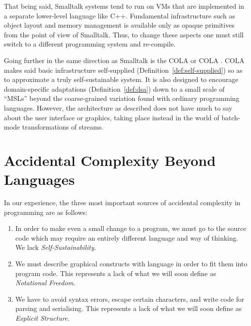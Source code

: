 \documentclass[ twoside,openright,titlepage,numbers=noenddot,headinclude,footinclude,cleardoublepage=empty,abstract=on,
                BCOR=5mm,paper=a4,fontsize=11pt
                ]{scrreprt}
\newcommand{\joel}[1]{}
\providecommand{\tightlist}{}\newenvironment{longtable}[2]{\begin{tabular}}{\end{tabular}}
\theoremstyle{definition}
\begin{document}
That being said, Smalltalk systems tend to run on VMs that are
implemented in a separate lower-level language like C++. Fundamental
infrastructure such as object layout and memory management is available
only as opaque primitives from the point of view of Smalltalk. Thus, to
change these aspects one must still switch to a different programming
system and re-compile.

Going further in the same direction as Smalltalk is the \acl{COLA} or
\acs{COLA}  \parencite{COLAs}. \ac{COLA} makes said basic
infrastructure self-supplied (Definition~\ref{def:self-supplied}) so as
to approximate a truly self-sustainable system. It is also designed to
encourage domain-specific adaptations (Definition~\ref{def:dsa}) down to
a small scale of ``\acp{MSL}'' beyond the coarse-grained variation found
with ordinary programming languages. However, the architecture as
described does not have much to say about the user interface or
graphics, taking place instead in the world of batch-mode
transformations of streams.

\joel{
## The Missing Synthesis

We have given the above examples because they demonstrate some of our ideals from Section\ \ref{how-should-things-work}. Web browsers and Smalltalk exhibit GUIs with the potential for domain-specific graphical adaptation (Web, Smalltalk)
2. Reliable, persistent naïve pokeability of state and behaviour (Smalltalk, COLA)
3. Full self-sustainability with domain-specific languages (COLA)

Why has a synthesis of all three not been achieved? Part of the difficulty is that programming is framed in terms of *languages* with a focus on parsed syntax and batch-mode transformations. This makes it an uphill battle to achieve even one of these three properties. 
}

\hypertarget{accidental-complexity-beyond-languages}{\section{Accidental Complexity Beyond
Languages}\label{accidental-complexity-beyond-languages}}

In our experience, the three most important sources of accidental
complexity in programming are as follows:

\begin{enumerate}
\def\labelenumi{\arabic{enumi}.}
\tightlist
\item
  In order to make even a small change to a program, we must go to the
  source code which may require an entirely different language and way
  of thinking. We lack \emph{Self-Sustainability.}
\item
  We must describe graphical constructs with language in order to fit
  them into program code. This represents a lack of what we will soon
  define as \emph{Notational Freedom.}
\item
  We have to avoid syntax errors, escape certain characters, and write
  code for parsing and serialising. This represents a lack of what we
  will soon define as \emph{Explicit Structure.}
\end{enumerate}
\end{document}
